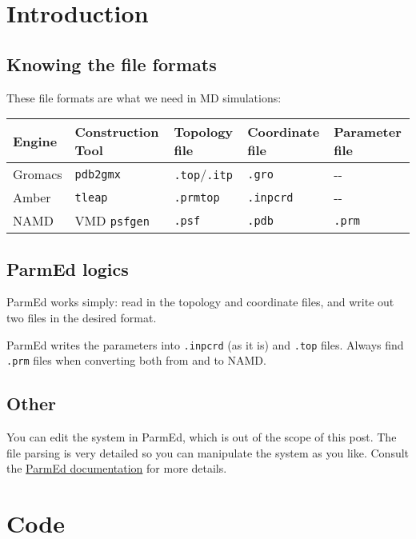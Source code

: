 \documentclass[
]{article}
\begin{document}
\hypertarget{introduction}{%
\section{Introduction}\label{introduction}}

\hypertarget{knowing-the-file-formats}{%
\subsection{Knowing the file formats}\label{knowing-the-file-formats}}

These file formats are what we need in MD simulations:

\begin{longtable}[]{@{}lllll@{}}
\toprule\noalign{}
Engine & Construction Tool & Topology file & Coordinate file & Parameter
file \\
\midrule\noalign{}
\endhead
\bottomrule\noalign{}
\endlastfoot
Gromacs & \texttt{pdb2gmx} & \texttt{.top}/\texttt{.itp} & \texttt{.gro}
& -\/- \\
Amber & \texttt{tleap} & \texttt{.prmtop} & \texttt{.inpcrd} & -\/- \\
NAMD & VMD \texttt{psfgen} & \texttt{.psf} & \texttt{.pdb} &
\texttt{.prm} \\
\end{longtable}

\hypertarget{parmed-logics}{%
\subsection{ParmEd logics}\label{parmed-logics}}

ParmEd works simply: read in the topology and coordinate files, and
write out two files in the desired format.

ParmEd writes the parameters into \texttt{.inpcrd} (as it is) and
\texttt{.top} files. Always find \texttt{.prm} files when converting
both from and to NAMD.

\hypertarget{other}{%
\subsection{Other}\label{other}}

You can edit the system in ParmEd, which is out of the scope of this
post. The file parsing is very detailed so you can manipulate the system
as you like. Consult the
\href{https://parmed.github.io/ParmEd/html/index.html}{ParmEd
documentation} for more details.

\hypertarget{code}{%
\section{Code}\label{code}}
\end{document}
